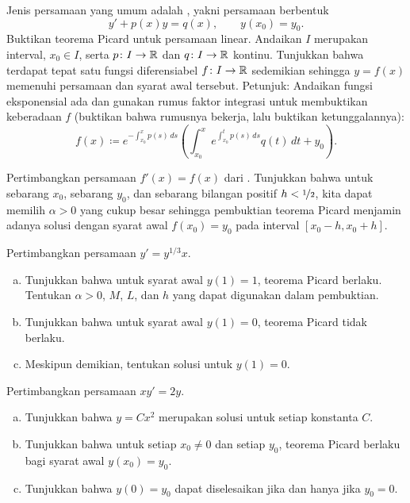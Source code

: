 \begin{exercise}
\pagebreak[2]
Jenis persamaan yang umum adalah
\emph{}, yakni
persamaan berbentuk
\begin{equation*}
y' + p(x) y = q(x) , \qquad y(x_0) = y_0 .
\end{equation*}
Buktikan teorema Picard untuk persamaan linear.  Andaikan $I$ merupakan
interval, $x_0 \in I$, serta $p \colon I \to {\mathbb{R}}$ dan $q \colon I \to {\mathbb{R}}$
kontinu.
Tunjukkan bahwa terdapat tepat satu fungsi diferensiabel $f \colon I \to {\mathbb{R}}$
sedemikian sehingga $y = f(x)$
memenuhi persamaan dan syarat awal tersebut.
Petunjuk: Andaikan fungsi eksponensial ada dan gunakan rumus faktor
integrasi untuk membuktikan keberadaan $f$ (buktikan bahwa rumusnya bekerja, lalu buktikan ketunggalannya):
\begin{equation*}
f(x) \coloneqq e^{-\int_{x_0}^x p(s)\, ds} \left( \int_{x_0}^x e^{\int_{x_0}^t p(s)\, ds}
q(t) \,dt + y_0 \right).
\end{equation*}
\end{exercise}

\begin{exercise}
Pertimbangkan persamaan $f'(x) = f(x)$
dari .  Tunjukkan bahwa untuk sebarang $x_0$,
sebarang $y_0$, dan sebarang bilangan positif $h < \nicefrac{1}{2}$, kita dapat memilih $\alpha >
0$ yang cukup besar sehingga pembuktian teorema Picard menjamin adanya solusi
dengan syarat awal $f(x_0) = y_0$ pada interval
$[x_0-h,x_0+h]$.
\end{exercise}

\begin{exercise}
\pagebreak[3]
Pertimbangkan persamaan $y' = y^{1/3}x$.
\begin{enumerate}[a)]
\item
Tunjukkan bahwa untuk syarat awal $y(1)=1$, teorema Picard berlaku.
Tentukan $\alpha > 0$, $M$, $L$, dan $h$ yang dapat digunakan dalam pembuktian.
\item
Tunjukkan bahwa untuk syarat awal $y(1) = 0$, teorema Picard
tidak berlaku.
\item
Meskipun demikian, tentukan solusi untuk $y(1) = 0$.
\end{enumerate}
\end{exercise}

\begin{exercise}
Pertimbangkan persamaan $x y' = 2y$.
\begin{enumerate}[a)]
\item
Tunjukkan bahwa $y = Cx^2$ merupakan solusi untuk setiap konstanta $C$.
\item
Tunjukkan bahwa untuk setiap $x_0 \neq 0$ dan setiap $y_0$, teorema
Picard berlaku bagi syarat awal $y(x_0) = y_0$.
\item
Tunjukkan bahwa $y(0) = y_0$ dapat diselesaikan jika dan hanya jika $y_0 = 0$.
\end{enumerate}
\end{exercise}
